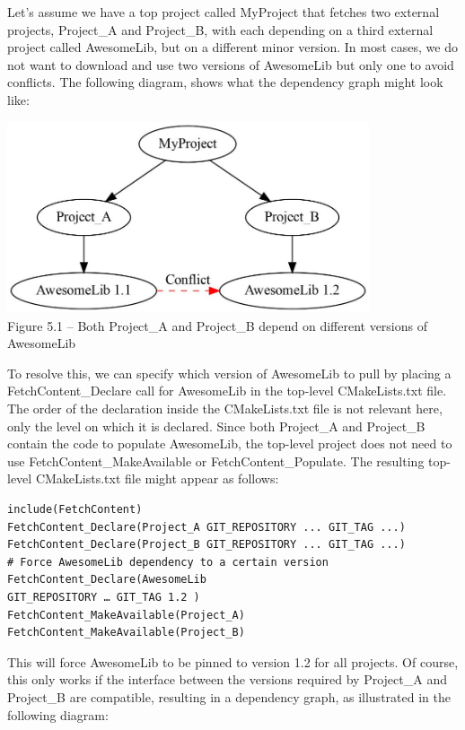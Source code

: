 Let's assume we have a top project called MyProject that fetches two external projects, Project\_A and Project\_B, with each depending on a third external project called AwesomeLib, but on a different minor version. In most cases, we do not want to download and use two versions of AwesomeLib but only one to avoid conflicts. The following diagram, shows what the dependency graph might look like:

\begin{center}
\includegraphics[width=0.8\textwidth]{content/2/chapter5/images/1.jpg}\\
Figure 5.1 – Both Project\_A and Project\_B depend on different versions of AwesomeLib
\end{center}

To resolve this, we can specify which version of AwesomeLib to pull by placing a FetchContent\_Declare call for AwesomeLib in the top-level CMakeLists.txt file. The order of the declaration inside the CMakeLists.txt file is not relevant here, only the level on which it is declared. Since both Project\_A and Project\_B contain the code to populate AwesomeLib, the top-level project does not need to use FetchContent\_MakeAvailable or FetchContent\_Populate. The resulting top-level CMakeLists.txt file might appear as follows:

\begin{lstlisting}[style=styleCMake]
include(FetchContent)
FetchContent_Declare(Project_A GIT_REPOSITORY ... GIT_TAG ...)
FetchContent_Declare(Project_B GIT_REPOSITORY ... GIT_TAG ...)
# Force AwesomeLib dependency to a certain version
FetchContent_Declare(AwesomeLib
GIT_REPOSITORY … GIT_TAG 1.2 )
FetchContent_MakeAvailable(Project_A)
FetchContent_MakeAvailable(Project_B)
\end{lstlisting}

This will force AwesomeLib to be pinned to version 1.2 for all projects. Of course, this only works if the interface between the versions required by Project\_A and Project\_B are compatible, resulting in a dependency graph, as illustrated in the following diagram:

